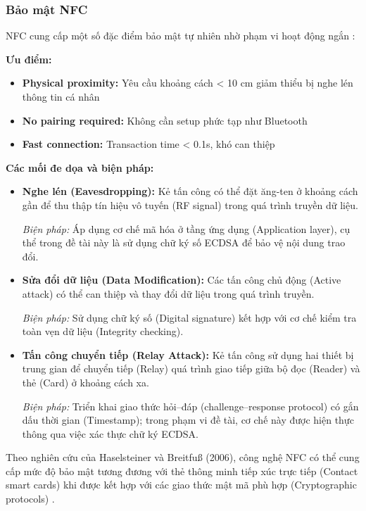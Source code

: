 \subsubsection{Bảo mật NFC}

NFC cung cấp một số đặc điểm bảo mật tự nhiên nhờ phạm vi hoạt động ngắn \cite{haselsteiner2006security}:
\par\vspace{0.5em}
\textbf{Ưu điểm:}
\begin{itemize}
    \item \textbf{Physical proximity:} Yêu cầu khoảng cách < 10 cm giảm thiểu bị nghe lén thông tin cá nhân
    \item \textbf{No pairing required:} Không cần setup phức tạp như Bluetooth
    \item \textbf{Fast connection:} Transaction time < 0.1s, khó can thiệp
\end{itemize}

\textbf{Các mối đe dọa và biện pháp:}
\begin{itemize}
    \item \textbf{Nghe lén (Eavesdropping):} 
    Kẻ tấn công có thể đặt ăng-ten ở khoảng cách gần để thu thập tín hiệu vô tuyến (RF signal) trong quá trình truyền dữ liệu. 

    
    \textit{Biện pháp:} Áp dụng cơ chế mã hóa ở tầng ứng dụng (Application layer), cụ thể trong đề tài này là sử dụng chữ ký số ECDSA để bảo vệ nội dung trao đổi.

    \item \textbf{Sửa đổi dữ liệu (Data Modification):} 
    Các tấn công chủ động (Active attack) có thể can thiệp và thay đổi dữ liệu trong quá trình truyền.

    
    \textit{Biện pháp:} Sử dụng chữ ký số (Digital signature) kết hợp với cơ chế kiểm tra toàn vẹn dữ liệu (Integrity checking).

    \item \textbf{Tấn công chuyển tiếp (Relay Attack):} 
    Kẻ tấn công sử dụng hai thiết bị trung gian để chuyển tiếp (Relay) quá trình giao tiếp giữa bộ đọc (Reader) và thẻ (Card) ở khoảng cách xa.

    
    \textit{Biện pháp:} Triển khai giao thức hỏi–đáp (challenge–response protocol) có gắn dấu thời gian (Timestamp); trong phạm vi đề tài, cơ chế này được hiện thực thông qua việc xác thực chữ ký ECDSA.
\end{itemize}


Theo nghiên cứu của Haselsteiner và Breitfuß (2006), công nghệ NFC có thể cung cấp mức độ bảo mật tương đương với thẻ thông minh tiếp xúc trực tiếp (Contact smart cards) khi được kết hợp với các giao thức mật mã phù hợp (Cryptographic protocols) \cite{haselsteiner2006security}.


